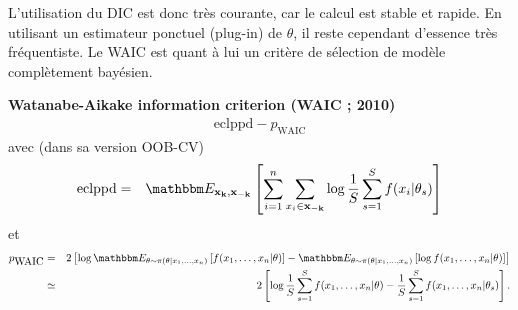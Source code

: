 L'utilisation du DIC est donc très courante, car le calcul est stable et rapide. En utilisant un estimateur ponctuel (plug-in) de $\theta$, il reste cependant d'essence très fréquentiste. Le WAIC est quant à lui un critère de sélection de modèle complètement bayésien.

\begin{definition}{\bf Watanabe-Aikake information criterion (WAIC ; 2010)}
\begin{eqnarray*}
\mbox{eclppd} - p_{\mbox{WAIC}} 
\end{eqnarray*}
avec (dans sa version OOB-CV) 
\begin{eqnarray*}
\mbox{eclppd} & = & \E_{{\bf x_k},{\bf x_{-k}}}\left[\sum\limits_{i=1}^n \sum\limits_{x_i \in {\bf x_{-k}}} \log \frac{1}{S} \sum\limits_{s=1}^S  f(x_i|\theta_s)\right] 
\end{eqnarray*}
et
\begin{eqnarray*}
p_{\mbox{WAIC}} & = & 2\left[ \log \E_{\theta\sim\pi(\theta|x_1,\ldots,x_n)} \left[f(x_1,\ldots,x_n|\theta)\right] - \E_{\theta\sim\pi(\theta|x_1,\ldots,x_n)}\left[\log f(x_1,\ldots,x_n|\theta)\right]\right] \\
& \simeq & 2\left[ \log \frac{1}{S} \sum\limits_{s=1}^S f(x_1,\ldots,x_n|\theta) -  \frac{1}{S} \sum\limits_{s=1}^S  f(x_1,\ldots,x_n|\theta_s) \right]. 
\end{eqnarray*}
\end{definition}
